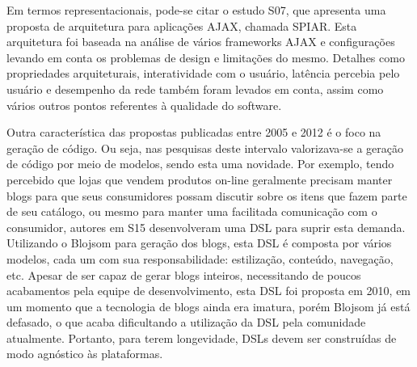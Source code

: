 Em termos representacionais, pode-se citar o estudo S07, que apresenta uma proposta de arquitetura para aplicações AJAX, chamada SPIAR. Esta arquitetura foi baseada na análise de vários frameworks AJAX e configurações levando em conta os problemas de design e limitações do mesmo. Detalhes como propriedades arquiteturais, interatividade com o usuário, latência percebia pelo usuário e desempenho da rede também foram levados em conta, assim como vários outros pontos referentes à qualidade do software. %


Outra característica das propostas publicadas entre 2005 e 2012 é o foco na geração de código. Ou seja, nas pesquisas deste intervalo valorizava-se a geração de código por meio de modelos, sendo esta uma novidade. Por exemplo, tendo percebido que lojas que vendem produtos on-line geralmente precisam manter blogs para que seus consumidores possam discutir sobre os itens que fazem parte de seu catálogo, ou mesmo para manter uma facilitada comunicação com o consumidor, autores em S15 desenvolveram uma DSL para suprir esta demanda. Utilizando o Blojsom para geração dos blogs, esta DSL é composta por vários modelos, cada um com sua responsabilidade: estilização, conteúdo, navegação, etc. Apesar de ser capaz de gerar blogs inteiros, necessitando de poucos acabamentos pela equipe de desenvolvimento, esta DSL foi proposta em 2010, em um momento que a tecnologia de blogs ainda era imatura, porém Blojsom já está defasado, o que acaba dificultando a utilização da DSL pela comunidade atualmente. Portanto, para terem longevidade, DSLs devem ser construídas de modo agnóstico às plataformas.







